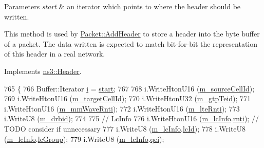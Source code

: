 \begin{DoxyParams}{Parameters}
{\em start} & an iterator which points to where the header should be written.\\
\hline
\end{DoxyParams}
This method is used by \hyperlink{classns3_1_1Packet_a465108c595a0bc592095cbcab1832ed8}{Packet\+::\+Add\+Header} to store a header into the byte buffer of a packet. The data written is expected to match bit-\/for-\/bit the representation of this header in a real network. 

Implements \hyperlink{classns3_1_1Header_afb61f1aac69ff8349a6bfe521fab5404}{ns3\+::\+Header}.


\begin{DoxyCode}
765 \{
766   Buffer::Iterator \hyperlink{bernuolliDistribution_8m_a6f6ccfcf58b31cb6412107d9d5281426}{i} = \hyperlink{namespacevisualizer_1_1core_a2a35e5d8a34af358b508dac8635754e0}{start};
767 
768   i.WriteHtonU16 (\hyperlink{classns3_1_1EpcX2RlcSetupRequestHeader_aa382eb05fd382b39d5e896e0d474b4c1}{m\_sourceCellId});
769   i.WriteHtonU16 (\hyperlink{classns3_1_1EpcX2RlcSetupRequestHeader_ab145b5aab23b77ae59c52feed51f006c}{m\_targetCellId}); 
770   i.WriteHtonU32 (\hyperlink{classns3_1_1EpcX2RlcSetupRequestHeader_a7e3b220f0853fbf4542cb74c164e4e53}{m\_gtpTeid}); 
771   i.WriteHtonU16 (\hyperlink{classns3_1_1EpcX2RlcSetupRequestHeader_a79082f7d2c079d5f07a2eee04a2478df}{m\_mmWaveRnti}); 
772   i.WriteHtonU16 (\hyperlink{classns3_1_1EpcX2RlcSetupRequestHeader_a3e69551771c7281ef6c352c6190d1718}{m\_lteRnti});
773   i.WriteU8 (\hyperlink{classns3_1_1EpcX2RlcSetupRequestHeader_a8319f64b745d6b66e7f898a182f77112}{m\_drbid});
774 
775   \textcolor{comment}{// LcInfo}
776   i.WriteHtonU16 (\hyperlink{classns3_1_1EpcX2RlcSetupRequestHeader_a737eacc0a9d3138b74e10147b97cb1b7}{m\_lcInfo}.\hyperlink{structns3_1_1LteEnbCmacSapProvider_1_1LcInfo_a6f1d91aecf5d18a79929328856e8ab47}{rnti}); \textcolor{comment}{// TODO consider if unnecessary}
777   i.WriteU8 (\hyperlink{classns3_1_1EpcX2RlcSetupRequestHeader_a737eacc0a9d3138b74e10147b97cb1b7}{m\_lcInfo}.\hyperlink{structns3_1_1LteEnbCmacSapProvider_1_1LcInfo_a5fd3cd842409e94a98c903b4d56069f4}{lcId});
778   i.WriteU8 (\hyperlink{classns3_1_1EpcX2RlcSetupRequestHeader_a737eacc0a9d3138b74e10147b97cb1b7}{m\_lcInfo}.\hyperlink{structns3_1_1LteEnbCmacSapProvider_1_1LcInfo_a3d9ae15a992e5f03d9fbabc600491dd6}{lcGroup});
779   i.WriteU8 (\hyperlink{classns3_1_1EpcX2RlcSetupRequestHeader_a737eacc0a9d3138b74e10147b97cb1b7}{m\_lcInfo}.\hyperlink{structns3_1_1LteEnbCmacSapProvider_1_1LcInfo_a02e6137db57dec3c10c9c03f4df1b109}{qci});

\end{DoxyCode}
